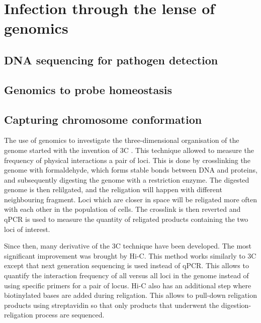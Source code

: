 
\chapter{Infection through the lense of genomics} %

\label{ch:01-02} %


\section{DNA sequencing for pathogen detection}

\section{Genomics to probe homeostasis}

\section{Capturing chromosome conformation}

The use of genomics to investigate the three-dimensional organisation of the genome started with the invention of \acrfull{3C} \cite{Dekker2002}. This technique allowed to measure the frequency of physical interactions a pair of loci. This is done by crosslinking the genome with formaldehyde, which forms stable bonds between DNA and proteins, and subsequently digesting the genome with a restriction enzyme. The digested genome is then relilgated, and the religation will happen with different neighbouring fragment. Loci which are closer in space will be religated more often with each other in the population of cells. The crosslink is then reverted and qPCR is used to measure the quantity of religated products containing the two loci of interest. 

Since then, many derivative of the \acrshort{3C} technique have been developed. The most significant improvement was brought by Hi-C. This method works similarly to 3C except that next generation sequencing is used instead of qPCR. This allows to quantify the interaction frequency of all versus all loci in the genome instead of using specific primers for a pair of locus. Hi-C also has an additional step where biotinylated bases are added during religation. This allows to pull-down religation products using streptavidin so that only products that underwent the digestion-religation process are sequenced.

